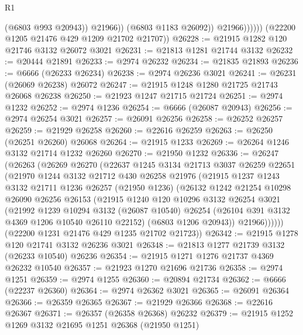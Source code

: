 \begin{lexlean}{R1}
\begin{coremodule}
                          (@6803 @993 @20943))
                        @21966))
                    (@6803 @1183 @26092))
                  @21966))))))
      (@22200 @1205 @21476 @429 @1209 @21702 @21707))
@26228 := @21915 @1282 @120 @21746 @3132 @26072 @3021
@26231 := @21813 @1281 @21744 @3132
@26232 := @20444 @21891
@26233 := @2974 @26232
@26234 := @21835 @21893
@26236 := @6666 (@26233 @26234)
@26238 := @2974 @26236 @3021
@26241 := @26231 (@26069 @26238) @26072
@26247 := @21915 @1248 @1280 @21725 @21743 @26068 @26238
@26250 := @21923 @1247 @21715 @21724
@26251 := @2974 @1232
@26252 := @2974 @1236
@26254 := @6666 (@26087 @20943)
@26256 := @2974 @26254 @3021
@26257 := @26091 @26256
@26258 := @26252 @26257
@26259 := @21929 @26258
@26260 := @22616 @26259
@26263 := @26250 (@26251 @26260) @26068
@26264 := @21915 @1233
@26269 := @26264 @1246 @3132 @21714 @1232 @26260
@26270 := @21950 @1232
@26336 := @26247
    (@26263
      (@26269
        @26270
        (@22637
          @1245
          @3134
          @21713
          @3037
          @26259
          @22651
          (@21970
            @1244
            @3132
            @21712
            @430
            @26258
            @21976
            (@21915
              @1237
              @1243
              @3132
              @21711
              @1236
              @26257
              (@21950 @1236)
              (@26132
                @1242
                @21254
                @10298
                @26090
                @26256
                @26153
                (@21915
                  @1240
                  @120
                  @10296
                  @3132
                  @26254
                  @3021
                  (@21992
                    @1239
                    @10294
                    @3132
                    (@26087 @10540)
                    @26254
                    (@26104 @391 @3132 @4369 @1206 @10540 @26110 @22152)
                    (@6803 @1206 @20943))
                  @21966))))))
      (@22200 @1231 @21476 @429 @1235 @21702 @21723))
@26342 := @21915 @1278 @120 @21741 @3132 @26236 @3021
@26348 := @21813 @1277 @21739 @3132 (@26233 @10540) @26236
@26354 := @21915 @1271 @1276 @21737 @4369 @26232 @10540
@26357 := @21923 @1270 @21696 @21736
@26358 := @2974 @1251
@26359 := @2974 @1255
@26360 := @20894 @21734
@26362 := @6666 (@22237 @26360)
@26364 := @2974 @26362 @3021
@26365 := @26091 @26364
@26366 := @26359 @26365
@26367 := @21929 @26366
@26368 := @22616 @26367
@26371 := @26357 (@26358 @26368) @26232
@26379 := @21915 @1252 @1269 @3132 @21695 @1251 @26368 (@21950 @1251)

\end{coremodule}
\end{lexlean}
